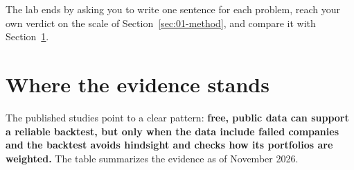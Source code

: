 
The lab ends by asking you to write one sentence for each problem, reach your own verdict on the scale of Section~\ref{sec:01-method}, and compare it with Section~\ref{sec:02-verdict}.

\section{Where the evidence stands}
\label{sec:02-verdict}

The published studies point to a clear pattern: \textbf{free, public data can support a reliable backtest, but only when the data include failed companies and the backtest avoids hindsight and checks how its portfolios are weighted.} The table summarizes the evidence as of November 2026.

